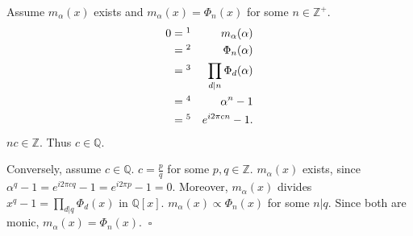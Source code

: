 \documentclass[twocolumn,11pt]{article}
\begin{document}
Assume $m_\alpha(x)$ exists and $m_\alpha(x)=\Phi_n(x)$ for some
$n\in\mathbb{Z}^+$.
\begin{eqnarray*}
0 &=\footnotemark[1]& m_\alpha(\alpha) \\
  &=\footnotemark[2]& \Phi_n(\alpha) \\
  &=\footnotemark[3]& \prod_{d|n}\Phi_d(\alpha) \\
  &=\footnotemark[4]& \alpha^n-1 \\
  &=\footnotemark[5]& e^{i2\pi cn}-1.
\end{eqnarray*}
$nc\in\mathbb Z$.  Thus $c\in\mathbb Q$.

Conversely, assume $c\in\mathbb{Q}$.
$c=\frac{p}{q}$ for some $p,q\in\mathbb Z$.
$m_\alpha(x)$ exists, since $\alpha^q-1=e^{i2\pi cq}-1=e^{i2\pi p}-1=0$.
Moreover, $m_\alpha(x)$ divides $x^q-1=\prod_{d|q}\Phi_d(x)$ in
$\mathbb Q[x]$.
$m_\alpha(x)\propto\Phi_n(x)$ for some $n|q$.
Since both are monic, $m_\alpha(x)=\Phi_n(x).\;\;\square$
\end{document}
